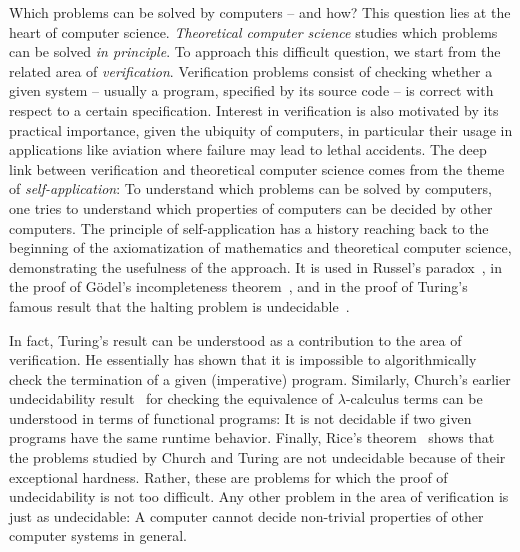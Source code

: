 \documentclass[../../diss.tex]{subfiles}
\begin{document}

Which problems can be solved by computers -- and how?
This question lies at the heart of computer science.
\emph{Theoretical computer science} studies which problems can be solved \emph{in principle}.
To approach this difficult question, we start from the related area of \emph{verification}.
Verification problems consist of checking whether a given system -- usually a program, specified by its source code -- is correct with respect to a certain specification.
Interest in verification is also motivated by its practical importance, given the ubiquity of computers, in particular their usage in applications like aviation where failure may lead to lethal accidents.
The deep link between verification and theoretical computer science comes from the theme of \emph{self-application}:
To understand which problems can be solved by computers, one tries to understand which properties of computers can be decided by other computers.
The principle of self-application has a history reaching back to the beginning of the axiomatization of mathematics and theoretical computer science, demonstrating the usefulness of the approach.
It is used in Russel's paradox~\cite{Russell03}, in the proof of Gödel's incompleteness theorem~\cite{Goedel31}, and in the proof of Turing's famous result that the halting problem is undecidable~\cite{Turing36}.

In fact, Turing's result can be understood as a contribution to the area of verification.
He essentially has shown that it is impossible to algorithmically check the termination of a given (imperative) program.
Similarly, Church's earlier undecidability result~\cite{Church36} for checking the equivalence of $\lambda$-calculus terms can be understood in terms of functional programs: It is not decidable if two given programs have the same runtime behavior.
Finally, Rice's theorem~\cite{Rice53} shows that the problems studied by Church and Turing are not undecidable because of their exceptional hardness.
Rather, these are problems for which the proof of undecidability is not too difficult.
Any other problem in the area of verification is just as undecidable:
A computer cannot decide non-trivial properties of other computer systems in general.
\end{document}
